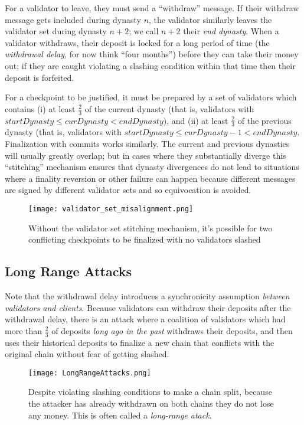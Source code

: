 \documentclass[12pt, final]{article}
\begin{document}
For a validator to leave, they must send a ``withdraw'' message. If their withdraw message gets included during dynasty $n$, the validator similarly leaves the validator set during dynasty $n+2$; we call $n+2$ their \textit{end dynasty}. When a validator withdraws, their deposit is locked for a long period of time (the \textit{withdrawal delay}, for now think ``four months'') before they can take their money out; if they are caught violating a slashing condition within that time then their deposit is forfeited.

For a checkpoint to be justified, it must be prepared by a set of validators which contains (i) at least $\frac{2}{3}$ of the current dynasty (that is, validators with $startDynasty \le curDynasty < endDynasty$), and (ii) at least $\frac{2}{3}$ of the previous dynasty (that is, validators with $startDynasty \le curDynasty - 1 < endDynasty$. Finalization with commits works similarly. The current and previous dynasties will usually greatly overlap; but in cases where they substantially diverge this ``stitching'' mechanism ensures that dynasty divergences do not lead to situations where a finality reversion or other failure can happen because different messages are signed by different validator sets and so equivocation is avoided.

\begin{figure}
\centering
\texttt{[image: validator\_set\_misalignment.png]}
\caption{Without the validator set stitching mechanism, it's possible for two conflicting checkpoints to be finalized with no validators slashed}
\end{figure}

\subsection{Long Range Attacks}

Note that the withdrawal delay introduces a synchronicity assumption \textit{between validators and clients}. Because validators can withdraw their deposits after the withdrawal delay, there is an attack where a coalition of validators which had more than $\frac{2}{3}$ of deposits \textit{long ago in the past} withdraws their deposits, and then uses their historical deposits to finalize a new chain that conflicts with the original chain without fear of getting slashed.

\begin{figure}
\centering
\texttt{[image: LongRangeAttacks.png]}
\caption{Despite violating slashing conditions to make a chain split, because the attacker has already withdrawn on both chains they do not lose any money. This is often called a \textit{long-range atack}.}
\label{fig:longrange}
\end{figure}
\end{document}
